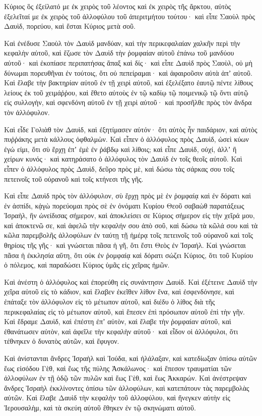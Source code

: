 {Κύριος ὃς ἐξείλατό με ἐκ χειρὸς τοῦ λέοντος καὶ ἐκ χειρὸς τῆς ἄρκτου, αὐτὸς ἐξελεῖταί με ἐκ χειρὸς τοῦ ἀλλοφύλου τοῦ ἀπεριτμήτου τούτου· καὶ εἶπε Σαοὺλ πρὸς Δαυὶδ, πορεύου, καὶ ἔσται Κύριος μετὰ σοῦ.
\par }{\PP {}Καὶ ἐνέδυσε Σαοὺλ τὸν Δαυὶδ μανδύαν, καὶ τὴν περικεφαλαίαν χαλκῆν περὶ τὴν κεφαλὴν αὐτοῦ,
καὶ ἔζωσε τὸν Δαυὶδ τὴν ῥομφαίαν αὐτοῦ ἐπάνω τοῦ μανδύου αὐτοῦ· καὶ ἐκοπίασε περιπατήσας ἅπαξ καὶ δίς· καὶ εἶπε Δαυὶδ πρὸς Σαοὺλ, οὐ μὴ δύνωμαι πορευθῆναι ἐν τούτοις, ὅτι οὐ πεπείραμαι· καὶ ἀφαιροῦσιν αὐτὰ ἀπʼ αὐτοῦ.
Καὶ ἔλαβε τὴν βακτηρίαν αὐτοῦ ἐν τῇ χειρὶ αὐτοῦ, καὶ ἐξελέξατο ἑαυτῷ πέντε λίθους λείους ἐκ τοῦ χειμάῤῥου, καὶ ἔθετο αὐτοὺς ἐν τῷ καδίῳ τῷ ποιμενικῷ τῷ ὄντι αὐτῷ εἰς συλλογὴν, καὶ σφενδόνη αὐτοῦ ἐν τῇ χειρὶ αὐτοῦ· καὶ προσῆλθε πρὸς τὸν ἄνδρα τὸν ἀλλόφυλον.
\par }{\PP {}Καὶ εἶδε Γολιὰθ τὸν Δαυὶδ, καὶ ἐξητίμασεν αὐτόν· ὅτι αὐτὸς ἦν παιδάριον, καὶ αὐτὸς πυῤῥάκης μετὰ κάλλους ὀφθαλμὼν.
Καὶ εἶπεν ὁ ἀλλόφυλος πρὸς Δαυὶδ, ὡσεὶ κύων ἐγώ εἰμι, ὅτι σὺ ἔρχῃ ἐπʼ ἐμὲ ἐν ῥάβδῳ καὶ λίθοις; καὶ εἶπε Δαυὶδ, οὐχί, ἀλλʼ ἢ χείρων κυνός· καὶ κατηράσατο ὁ ἀλλόφυλος τὸν Δαυὶδ ἐν τοῖς θεοῖς αὐτοῦ.
Καὶ εἶπεν ὁ ἀλλόφυλος πρὸς Δαυὶδ, δεῦρο πρὸς μὲ, καὶ δώσω τὰς σάρκας σου τοῖς πετεινοῖς τοῦ οὐρανοῦ καὶ τοῖς κτήνεσι τῆς γῆς.
\par }{\PP {}Καὶ εἶπε Δαυὶδ πρὸς τὸν ἀλλόφυλον, σὺ ἔρχῃ πρὸς μὲ ἐν ῥομφαίᾳ καὶ ἐν δόρατι καὶ ἐν ἀσπίδι, κᾀγὼ πορεύομαι πρὸς σὲ ἐν ὀνόματι Κυρίου Θεοῦ σαβαὼθ παρατάξεως Ἰσραὴλ, ἣν ὠνείδισας σήμερον,
καὶ ἀποκλείσει σε Κύριος σήμερον εἰς τὴν χεῖρά μου, καὶ ἀποκτενῶ σε, καὶ ἀφελῶ τὴν κεφαλήν σου ἀπὸ σοῦ, καὶ δώσω τὰ κῶλά σου καὶ τὰ κῶλα παρεμβολῆς ἀλλοφύλων ἐν ταύτῃ τῇ ἡμέρᾳ τοῖς πετεινοῖς τοῦ οὐρανοῦ καὶ τοῖς θηρίοις τῆς γῆς· καὶ γνώσεται πᾶσα ἡ γῆ, ὅτι ἔστι Θεὸς ἐν Ἰσραήλ.
Καὶ γνώσεται πᾶσα ἡ ἐκκλησία αὕτη, ὅτι οὐκ ἐν ῥομφαίᾳ καὶ δόρατι σώζει Κύριος, ὅτι τοῦ Κυρίου ὁ πόλεμος, καὶ παραδώσει Κύριος ὑμᾶς εἰς χεῖρας ἡμῶν.
\par }{\PP {}Καὶ ἀνέστη ὁ ἀλλόφυλος καὶ ἐπορεύθη εἰς συνάντησιν Δαυίδ.
Καὶ ἐξέτεινε Δαυὶδ τὴν χεῖρα αὐτοῦ εἰς τὸ κάδιον, καὶ ἔλαβεν ἐκεῖθεν λίθον ἕνα, καὶ ἐσφενδόνησε, καὶ ἐπάταξε τὸν ἀλλόφυλον εἰς τὸ μέτωπον αὐτοῦ, καὶ διέδυ ὁ λίθος διὰ τῆς περικεφαλαίας εἰς τὸ μέτωπον αὐτοῦ, καὶ ἔπεσεν ἐπὶ πρόσωπον αὐτοῦ ἐπὶ τὴν γῆν.
Καὶ ἔδραμε Δαυὶδ, καὶ ἐπέστη ἐπʼ αὐτὸν, καὶ ἔλαβε τὴν ῥομφαίαν αὐτοῦ, καὶ ἐθανάτωσεν αὐτὸν, καὶ ἀφεῖλε τὴν κεφαλὴν αὐτοῦ· καὶ εἶδον οἱ ἀλλόφυλοι, ὅτι τέθνηκεν ὁ δυνατὸς αὐτῶν, καὶ ἔφυγον.
\par }{\PP {}Καὶ ἀνίστανται ἄνδρες Ἰσραὴλ καὶ Ἰούδα, καὶ ἠλάλαξαν, καὶ κατεδίωξαν ὀπίσω αὐτῶν ἕως εἰσόδου Γὲθ, καὶ ἕως τῆς πύλης Ἀσκάλωνος· καὶ ἔπεσον τραυματίαι τῶν ἀλλοφύλων ἐν τῇ ὁδῷ τῶν πυλῶν καὶ ἕως Γὲθ, καὶ ἕως Ἀκκαρών.
Καὶ ἀνέστρεψαν ἄνδρες Ἰσραὴλ ἐκκλίνοντες ὀπίσω τῶν ἀλλοφύλων, καὶ κατεπάτουν τὰς παρεμβολὰς αὐτῶν.
Καὶ ἔλαβε Δαυὶδ τὴν κεφαλὴν τοῦ ἀλλοφύλου, καὶ ἤνεγκεν αὐτὴν εἰς Ἰερουσαλὴμ, καὶ τὰ σκεύη αὐτοῦ ἔθηκεν ἐν τῷ σκηνώματι αὐτοῦ.

}

